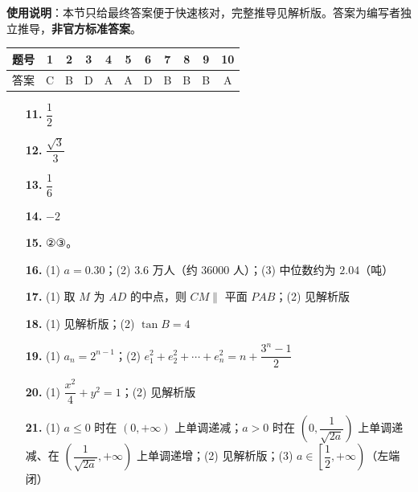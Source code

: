 
\begin{gknotice}
\textbf{使用说明}：本节只给最终答案便于快速核对，完整推导见解析版。答案为编写者独立推导，\textbf{非官方标准答案}。
\end{gknotice}

\begin{center}\begin{tabular}{ccccccccccc}
\toprule
题号 & 1 & 2 & 3 & 4 & 5 & 6 & 7 & 8 & 9 & 10 \\
\midrule
答案 & C & B & D & A & A & D & B & B & B & A \\
\bottomrule
\end{tabular}\end{center}

\begin{itemize}[leftmargin=2.6em]
  \item[\textbf{11.}] \(\dfrac{1}{2}\)
  \item[\textbf{12.}] \(\dfrac{\sqrt{3}}{3}\)
  \item[\textbf{13.}] \(\dfrac{1}{6}\)
  \item[\textbf{14.}] \(-2\)
  \item[\textbf{15.}] ②③。
\end{itemize}

\begin{itemize}[leftmargin=2.6em]
  \item[\textbf{16.}] (1) \(a=0.30\)；(2) \(3.6\) 万人（约 \(36000\) 人）；(3) 中位数约为 \(2.04\)（吨）
  \item[\textbf{17.}] (1) 取 \(M\) 为 \(AD\) 的中点，则 \(CM\parallel\) 平面 \(PAB\)；(2) 见解析版
  \item[\textbf{18.}] (1) 见解析版；(2) \(\tan B=4\)
  \item[\textbf{19.}] (1) \(a_{n}=2^{n-1}\)；(2) \(e_{1}^{2}+e_{2}^{2}+\cdots+e_{n}^{2}=n+\dfrac{3^{n}-1}{2}\)
  \item[\textbf{20.}] (1) \(\dfrac{x^{2}}{4}+y^{2}=1\)；(2) 见解析版
  \item[\textbf{21.}] (1) \(a\leqslant0\) 时在 \((0,+\infty)\) 上单调递减；\(a>0\) 时在 \((0,\dfrac{1}{\sqrt{2a}})\) 上单调递减、在 \((\dfrac{1}{\sqrt{2a}},+\infty)\) 上单调递增；(2) 见解析版；(3) \(a\in\left[\dfrac{1}{2},+\infty\right)\)（左端闭）
\end{itemize}
